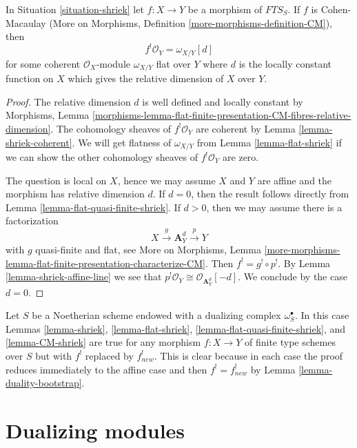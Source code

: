 \begin{lemma}
\label{lemma-CM-shriek}
In Situation \ref{situation-shriek} let $f : X \to Y$ be a morphism of
$\textit{FTS}_S$. If $f$ is Cohen-Macaulay (More on Morphisms, Definition
\ref{more-morphisms-definition-CM}), then
$$
f^!\mathcal{O}_Y = \omega_{X/Y}[d]
$$
for some coherent $\mathcal{O}_X$-module $\omega_{X/Y}$ flat over $Y$
where $d$ is the locally constant
function on $X$ which gives the relative dimension of $X$ over $Y$.
\end{lemma}

\begin{proof}
The relative dimension $d$ is well defined and locally constant by
Morphisms, Lemma
\ref{morphisms-lemma-flat-finite-presentation-CM-fibres-relative-dimension}.
The cohomology sheaves of $f^!\mathcal{O}_Y$ are coherent by
Lemma \ref{lemma-shriek-coherent}.
We will get flatness of $\omega_{X/Y}$ from Lemma \ref{lemma-flat-shriek}
if we can show the other cohomology sheaves of $f^!\mathcal{O}_Y$
are zero.

\medskip\noindent
The question is local on $X$, hence we may assume $X$ and $Y$ are affine
and the morphism has relative dimension $d$. If $d = 0$, then the
result follows directly from Lemma \ref{lemma-flat-quasi-finite-shriek}.
If $d > 0$, then we may assume there is a factorization
$$
X \xrightarrow{g} \mathbf{A}^d_Y \xrightarrow{p} Y
$$
with $g$ quasi-finite and flat, see More on Morphisms, Lemma
\ref{more-morphisms-lemma-flat-finite-presentation-characterize-CM}.
Then $f^! = g^! \circ p^!$. By Lemma \ref{lemma-shriek-affine-line}
we see that $p^!\mathcal{O}_Y \cong \mathcal{O}_{\mathbf{A}^d_Y}[-d]$.
We conclude by the case $d = 0$.
\end{proof}

\begin{remark}
\label{remark-the-same-is-true}
Let $S$ be a Noetherian scheme endowed with a dualizing complex
$\omega_S^\bullet$. In this case
Lemmas \ref{lemma-shriek}, \ref{lemma-flat-shriek},
\ref{lemma-flat-quasi-finite-shriek}, and \ref{lemma-CM-shriek}
are true for any morphism $f : X \to Y$ of finite type schemes over $S$
but with $f^!$ replaced by $f_{new}^!$. This is clear because in each
case the proof reduces immediately to the affine case
and then $f^! = f_{new}^!$ by Lemma \ref{lemma-duality-bootstrap}.
\end{remark}




\section{Dualizing modules}
\label{section-dualizing-module}


